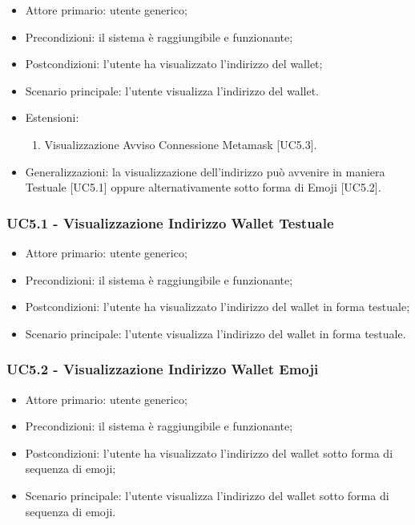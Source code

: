 \begin{itemize}
    \item Attore primario: utente generico;
    \item Precondizioni: il sistema è raggiungibile e funzionante;
    \item Postcondizioni: l'utente ha visualizzato l'indirizzo del wallet\glo{};
    \item Scenario principale: l'utente visualizza l'indirizzo del wallet\glo{}.
    \item Estensioni:
    \begin{enumerate}
        \item Visualizzazione Avviso Connessione Metamask\glo{} [UC5.3].
    \end{enumerate}
    \item Generalizzazioni: la visualizzazione dell'indirizzo può avvenire in maniera Testuale [UC5.1] oppure alternativamente sotto forma di Emoji [UC5.2].
\end{itemize}

\subsubsection{UC5.1 - Visualizzazione Indirizzo Wallet Testuale}

\begin{itemize}
    \item Attore primario: utente generico;
    \item Precondizioni: il sistema è raggiungibile e funzionante;
    \item Postcondizioni: l'utente ha visualizzato l'indirizzo del wallet\glo{} in forma testuale;
    \item Scenario principale: l'utente visualizza l'indirizzo del wallet\glo{} in forma testuale.
\end{itemize}

\subsubsection{UC5.2 - Visualizzazione Indirizzo Wallet Emoji}

\begin{itemize}
    \item Attore primario: utente generico;
    \item Precondizioni: il sistema è raggiungibile e funzionante;
    \item Postcondizioni: l'utente ha visualizzato l'indirizzo del wallet\glo{} sotto forma di sequenza di emoji;
    \item Scenario principale: l'utente visualizza l'indirizzo del wallet\glo{} sotto forma di sequenza di emoji.
\end{itemize}

